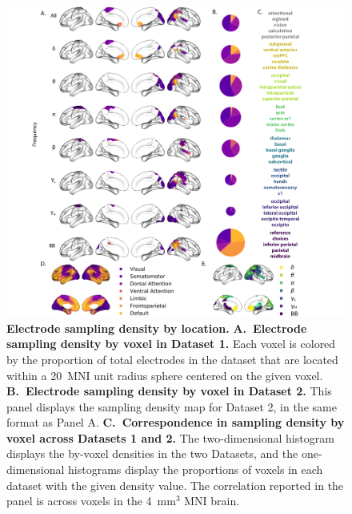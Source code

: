 \documentclass[11pt]{article}
\begin{document}
\begin{figure}
  \centering
  \includegraphics[width=\textwidth]{figs/networks}
  \caption{\textbf{Electrode sampling density by location.}
    \textbf{A.~Electrode sampling density by voxel in Dataset 1.} Each
    voxel is colored by the proportion of total electrodes in the
    dataset that are
    located within a 20~MNI unit radius sphere centered on the given
    voxel.  \textbf{B.~Electrode sampling density by voxel in Dataset
      2.}  This panel displays the sampling density map for Dataset 2,
    in the same format as Panel A.  \textbf{C.~Correspondence in
      sampling density by voxel across Datasets 1 and 2.}  The
    two-dimensional histogram displays the by-voxel densities in the
    two Datasets, and the one-dimensional histograms display the
    proportions of voxels in each dataset with the given density
    value.  The correlation reported in the panel is across voxels in
    the 4~mm$^3$ MNI brain.}
  \label{fig: networks}
\end{figure}
\end{document}
